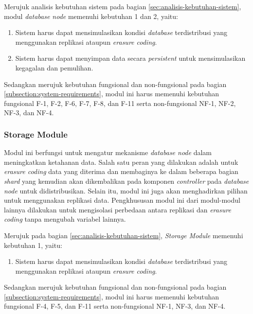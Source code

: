 Merujuk analisis kebutuhan sistem pada bagian \ref{sec:analisis-kebutuhan-sistem}, modul \textit{database node} memenuhi kebutuhan 1 dan 2, yaitu:

\begin{enumerate}
    \item Sistem harus dapat mensimulasikan kondisi \textit{database} terdistribusi yang menggunakan replikasi ataupun \textit{erasure coding}.
    \item Sistem harus dapat menyimpan data secara \textit{persistent} untuk mensimulasikan kegagalan dan pemulihan.
\end{enumerate}

Sedangkan merujuk kebutuhan fungsional dan non-fungsional pada bagian \ref{subsection:system-requirements}, modul ini harus memenuhi kebutuhan fungsional F-1, F-2, F-6, F-7, F-8, dan F-11 serta non-fungsional NF-1, NF-2, NF-3, dan NF-4.

\subsubsection{Storage Module}
\label{subsubsection:storage-module}

Modul ini berfungsi untuk mengatur mekanisme \textit{database node} dalam meningkatkan ketahanan data. Salah satu peran yang dilakukan adalah  untuk \textit{erasure coding} data yang diterima dan membaginya ke dalam beberapa bagian \textit{shard} yang kemudian akan dikembalikan pada komponen \textit{controller} pada \textit{database node} untuk didistribusikan. Selain itu, modul ini juga akan menghadirkan pilihan untuk menggunakan replikasi data. Pengkhususan modul ini dari modul-modul lainnya dilakukan untuk mengisolasi perbedaan antara replikasi dan \textit{erasure coding} tanpa mengubah variabel lainnya.

Merujuk pada bagian \ref{sec:analisis-kebutuhan-sistem}, \textit{Storage Module} memenuhi kebutuhan 1, yaitu:

\begin{enumerate}
    \item Sistem harus dapat mensimulasikan kondisi \textit{database} terdistribusi yang menggunakan replikasi ataupun \textit{erasure coding}.
\end{enumerate}

Sedangkan merujuk kebutuhan fungsional dan non-fungsional pada bagian \ref{subsection:system-requirements}, modul ini harus memenuhi kebutuhan fungsional F-4, F-5, dan F-11 serta non-fungsional NF-1, NF-3, dan NF-4.

